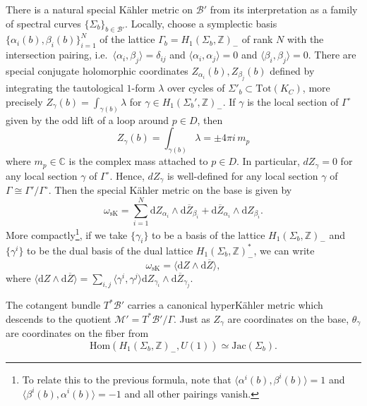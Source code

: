 \documentclass[12pt,letterpaper,reqno]{amsart}
\theoremstyle{remark}
\theoremstyle{definition}
\numberwithin{thm}{section}
\numberwithin{equation}{section}
\numberwithin{figure}{section}
\newcommand{\cB}{\ensuremath{\mathcal B}}
\newcommand{\cM}{\ensuremath{\mathcal M}}
\newcommand{\C}{\ensuremath{\mathbb C}}
\newcommand{\Z}{\ensuremath{\mathbb Z}}
\newcommand{\de}{\mathrm{d}}
\newcommand{\IP}[1]{\langle#1\rangle}
\begin{document}
 There is a natural special K\"ahler metric on $\cB'$ from its interpretation as a family of spectral curves $\{\Sigma_b\}_{b \in \cB'}$. Locally, choose a symplectic basis $\{\alpha_i(b), \beta_i(b)\}_{i=1}^N$ of the lattice $\Gamma_b = H_1(\Sigma_b, \Z)_-$ of rank $N$ with the intersection pairing, i.e.\ $\IP{\alpha_i, \beta_j} = \delta_{ij}$ and $\IP{\alpha_i, \alpha_j}=0$ and $\IP{\beta_i, \beta_j}=0$. There are special conjugate holomorphic coordinates $Z_{\alpha_i}(b), Z_{\beta_j}(b)$ defined by integrating the tautological $1$-form $\lambda$ over cycles of $\Sigma'_b \subset \mathrm{Tot}(K_C)$, more precisely $Z_{\gamma}(b)=\int_{\gamma(b)} \lambda$ for $\gamma \in H_1(\Sigma_b',\Z)_-$. If $\gamma$ is the local section of $\Gamma^{\circ}$ given by the odd lift of a loop around $p \in D$, then
 \[
 Z_\gamma(b) = \int_{\gamma(b)} \lambda = \pm  4 \pi i  \, m_p
 \]
 where $m_p \in \C$ is the complex mass attached to $p \in D$. In particular, $dZ_\gamma =0$ for any local section $\gamma$ of $\Gamma^{\circ}$. Hence, $dZ_\gamma$ is well-defined for any local section $\gamma$ of $\Gamma \cong \Gamma'/\Gamma^{\circ}$. Then the special K\"ahler metric on the base is given by 
  \[\omega_{\mathrm{sK}} = \sum_{i=1}^N \de Z_{\alpha_i} \wedge \de \overline{Z}_{\beta_i} + \de \overline{Z}_{\alpha_i} \wedge \de Z_{\beta_i}.\]
  More compactly\footnote{To relate this to the previous formula, note that $\langle\alpha^i(b), \beta^i(b)\rangle=1$ and $\langle\beta^i(b), \alpha^i(b)\rangle=-1$ and all other pairings vanish.}, if we take $\{\gamma_i\}$ to be a basis of the lattice $H_1(\Sigma_b, \Z)_-$ and $\{\gamma^i\}$ to be the dual basis of the dual lattice $H_1(\Sigma_b, \Z)^*_-$, we can write  \[\omega_{\mathrm{sK}}=\langle \de Z \wedge \de \overline{Z}\rangle,\]
  where $\langle \de Z \wedge \de \overline{Z}\rangle= \sum_{i,j}\langle\gamma^i, \gamma^j\rangle \de Z_{\gamma_i} \wedge \de \overline{Z}_{\gamma_j}$. 

 The cotangent bundle $T^*\cB'$ carries a canonical hyperK\"ahler metric \cite[Theorem 2.1]{freedsemiflat} which descends to the quotient $\cM' = T^* \cB'/\Gamma$. 
  Just as $Z_\gamma$ are coordinates on the base, $\theta_\gamma$ are coordinates on the fiber from 
  \[\mathrm{Hom}(H_1(\Sigma_b, \Z)_-, U(1)) \simeq \mathrm{Jac}(\Sigma_b). \]
  
\end{document}
